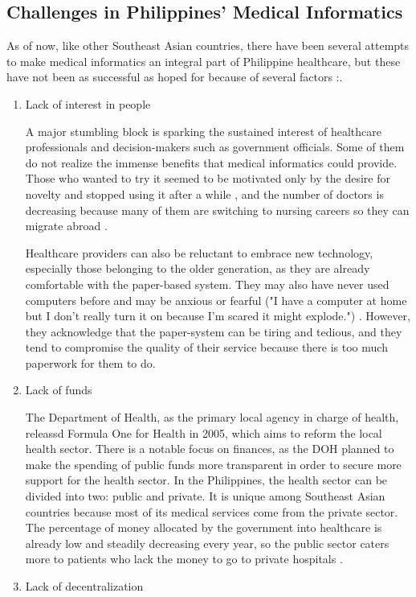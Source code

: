 \subsection{Challenges in Philippines' Medical Informatics}

As of now, like other Southeast Asian countries, there have been several attempts to make medical informatics an integral part of Philippine healthcare, but these have not been as successful as hoped for because of several factors \cite{nguyen2008analysis}:.

\begin{enumerate}
    \item Lack of interest in people

    A major stumbling block is sparking the sustained interest of healthcare professionals and decision-makers such as government officials. Some of them do not realize the immense benefits that medical informatics could provide. Those who wanted to try it seemed to be motivated only by the desire for novelty and stopped using it after a while \cite{marcelo2007health},  and the number of doctors is decreasing because many of them are switching to nursing careers so they can migrate abroad \cite{nguyen2008analysis}.

    Healthcare providers can also be reluctant to embrace new technology, especially those belonging to the older generation, as they are already comfortable with the paper-based system. They may also have never used computers before and may be anxious or fearful ("I have a computer at home but I don't really turn it on because I'm scared it might explode.") \cite{premji2012implementing}. However, they acknowledge that the paper-system can be tiring and tedious, and they tend to compromise the quality of their service because there is too much paperwork for them to do.
    \item Lack of funds

    The Department of Health, as the primary local agency in charge of health, releassd Formula One for Health in 2005, which aims to reform the local health sector. There is a notable focus on finances, as the DOH planned to make the spending of public funds more transparent in order to secure more support for the health sector. In the Philippines, the health sector can be divided into two: public and private. It is unique among Southeast Asian countries because most of its medical services come from the private sector. The percentage of money allocated by the government into healthcare is already low and steadily decreasing every year, so the public sector caters more to patients who lack the money to go to private hospitals \cite{nguyen2008analysis}.
    \item Lack of decentralization


\end{enumerate}
